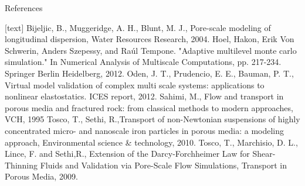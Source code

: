 \documentclass[final,english]{beamer}
\begin{document}
\begin{frame}[plain]{}
\begin{columns}
      
    \begin{alertblock}{References}    
{ \footnotesize
  \begin{thebibliography}{1}
  [text]
   Bijeljic, B., Muggeridge, A. H., Blunt, M. J., Pore-scale modeling of
  longitudinal dispersion, Water Resources Research, 2004.
   Hoel, Hakon, Erik Von Schwerin, Anders Szepessy, and Raúl Tempone. "Adaptive multilevel monte carlo simulation." In Numerical Analysis of Multiscale Computations, pp. 217-234. Springer Berlin Heidelberg, 2012.
   Oden, J. T., Prudencio, E. E., Bauman, P. T., Virtual model validation of complex multi scale systems: applications to nonlinear elastostatics. ICES report, 2012.
   Sahimi, M., Flow and transport in porous media and fractured rock: from classical methods to modern approaches, VCH, 1995
   Tosco, T., Sethi, R.,Transport of non-Newtonian suspensions of highly concentrated micro- and nanoscale iron particles in porous media: a modeling approach, Environmental science \& technology, 2010.
 Tosco, T., Marchisio, D. L., Lince, F. and Sethi,R., Extension of the Darcy-Forchheimer Law for Shear-Thinning Fluids and Validation via Pore-Scale Flow Simulations, Transport in Porous Media, 2009.
  \end{thebibliography}
  }
    \end{alertblock}
             \vfill

      \end{columns}
             \vfill

  \end{frame}
\end{document}
